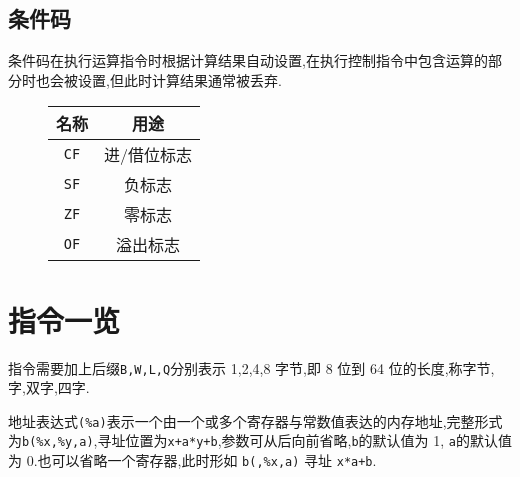         \subsection{条件码}
        条件码在执行运算指令时根据计算结果自动设置,在执行控制指令中包含运算的部分时也会被设置,但此时计算结果通常被丢弃.
        \begin{figure}[htbp]
            \centering
            \begin{tabular}{c||c}
                名称 & 用途\\\hline\hline
                \texttt{CF} & 进/借位标志\\\hline
                \texttt{SF} & 负标志\\\hline
                \texttt{ZF} & 零标志\\\hline
                \texttt{OF} & 溢出标志\\
            \end{tabular}
        \end{figure}
    \section{指令一览}
        指令需要加上后缀\texttt{B,W,L,Q}分别表示 1,2,4,8 字节,即 8 位到 64 位的长度,称字节,字,双字,四字.

        地址表达式\texttt{(\%a)}表示一个由一个或多个寄存器与常数值表达的内存地址,完整形式为\texttt{b(\%x,\%y,a)},寻址位置为\texttt{x+a*y+b},参数可从后向前省略,\texttt{b}的默认值为 1, \texttt{a}的默认值为 0.也可以省略一个寄存器,此时形如 \texttt{b(,\%x,a)} 寻址 \texttt{x*a+b}.
